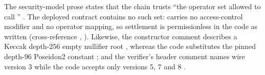 \begin{specdelta}
The security-model prose states that the chain trusts ``the operator set
allowed to call '' . The deployed
contract contains no such set:  carries no access-control
modifier and no operator mapping, so settlement is permissionless in the code
as written  (cross-reference
, ). Likewise, the constructor comment describes a
Keccak depth-256 empty nullifier root ,
whereas the code substitutes the pinned depth-96 Poseidon2 constant
;
and the verifier's header comment names wire version 3
 while the code accepts only
versions 5, 7 and 8 .
\end{specdelta}
